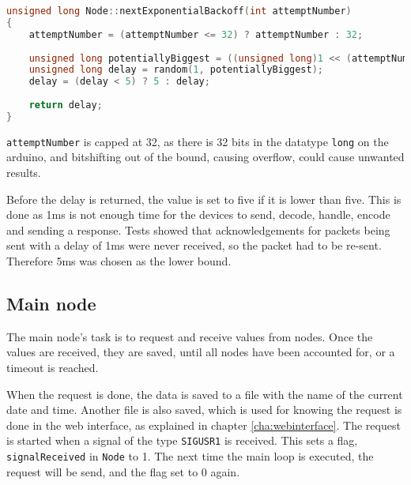 \begin{lstlisting}[language=C,caption={Exponential backoff on the sensor nodes. In Node.cpp.},label={lst:expbackoff}]
unsigned long Node::nextExponentialBackoff(int attemptNumber)
{
    attemptNumber = (attemptNumber <= 32) ? attemptNumber : 32;
    
    unsigned long potentiallyBiggest = ((unsigned long)1 << (attemptNumber - 1));
    unsigned long delay = random(1, potentiallyBiggest);
    delay = (delay < 5) ? 5 : delay;
    
    return delay;
}
\end{lstlisting}
\texttt{attemptNumber} is capped at 32, as there is 32 bits in the datatype \texttt{long} on the arduino, and bitshifting out of the bound, causing overflow, could cause unwanted results.

Before the delay is returned, the value is set to five if it is lower than five. This is done as 1ms is not enough time for the devices to send, decode, handle, encode and sending a response. Tests showed that acknowledgements for packets being sent with a delay of 1ms were never received, so the packet had to be re-sent. Therefore 5ms was chosen as the lower bound.

\subsection{Main node} \label{cha:signalhandling}
The main node's task is to request and receive values from nodes. Once the values are received, they are saved, until all nodes have been accounted for, or a timeout is reached.

When the request is done, the data is saved to a file with the name of the current date and time. Another file is also saved, which is used for knowing the request is done in the web interface, as explained in chapter \ref{cha:webinterface}. The request is started when a signal of the type \texttt{SIGUSR1} is received. This sets a flag, \texttt{signalReceived} in \texttt{Node} to 1. The next time the main loop is executed, the request will be send, and the flag set to 0 again.
